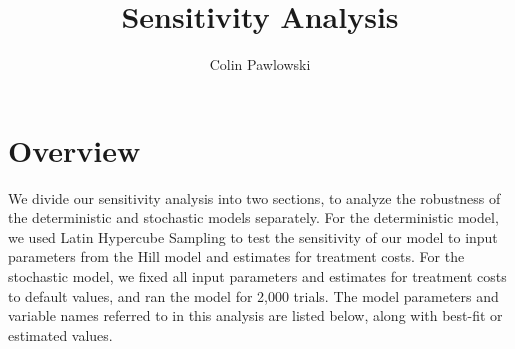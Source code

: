 \documentclass{article}[11pt]
\begin{document}
\title{Sensitivity Analysis}
\author{Colin Pawlowski}
\date{}
\maketitle


\section{Overview}
We divide our sensitivity analysis into two sections, to analyze the robustness of the deterministic and stochastic models separately.  For the deterministic model, we used Latin Hypercube Sampling to test the sensitivity of our model to input parameters from the Hill model and estimates for treatment costs.  
For the stochastic model, we fixed all input parameters and estimates for treatment costs to default values, and ran the model for 2,000 trials.  The model parameters and variable names referred to in this analysis are listed below, along with best-fit or estimated values.  \\
\end{document}

